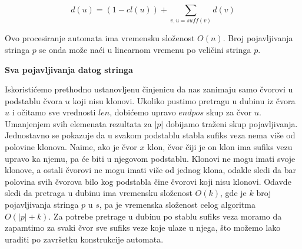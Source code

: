 \begin{equation}
    d(u) = (1 - cl(u)) + \sum_{v, u = suff(v)} d(v)
\end{equation}

Ovo procesiranje automata ima vremensku slo\v zenost $O(n)$. Broj pojavljivanja stringa $p$ se onda mo\v ze na\'ci u linearnom vremenu po veli\v cini stringa $p$.

\noindent
\textbf{Sva pojavljivanja datog stringa}

Iskoristi\' cemo prethodno ustanovljenu \v cinjenicu da nas zanimaju samo \v cvorovi u podstablu \v cvora $u$ koji nisu klonovi. Ukoliko pustimo pretragu u dubinu iz \v cvora $u$ i o\v citamo sve vrednosti $len$, dobi\' cemo upravo $endpos$ skup za \v cvor $u$. Umanjenjem svih elemenata rezultata za $|p|$ dobijamo tra\v zeni skup pojavljivanja. Jednostavno se pokazuje da u svakom podstablu stabla sufiks veza nema vi\v se od polovine klonova. Naime, ako je \v cvor $x$ klon, \v cvor \v ciji je on klon ima sufiks vezu upravo ka njemu, pa \' ce biti u njegovom podstablu. Klonovi ne mogu imati svoje klonove, a ostali \v cvorovi ne mogu imati vi\v se od jednog klona, odakle sledi da bar polovina svih \v cvorova bilo kog podstabla \v cine \v cvorovi koji nisu klonovi. Odavde sledi da pretraga u dubinu ima vremensku slo\v zenost $O(k)$, gde je $k$ broj pojavljivanja stringa $p$ u $s$, pa je vremenska slo\v zenost celog algoritma $O(|p|+k)$. Za potrebe pretrage u dubinu po stablu sufiks veza moramo da zapamtimo za svaki \v cvor sve sufiks veze koje ulaze u njega, \v sto mo\v zemo lako uraditi po zavr\v setku konstrukcije automata.
